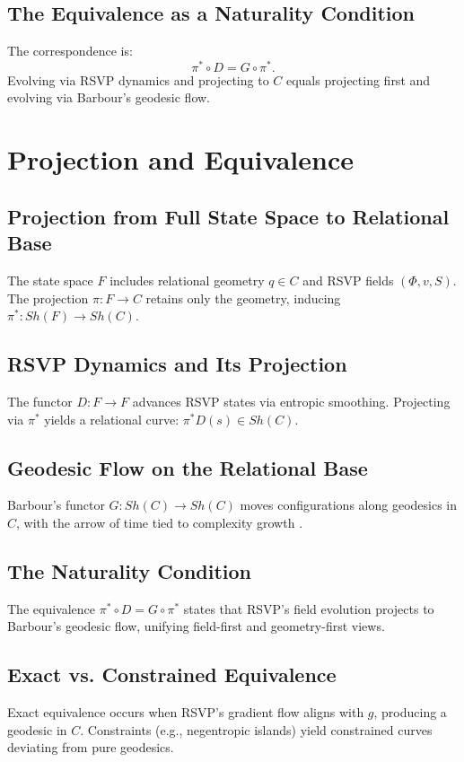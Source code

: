 \documentclass[11pt]{article}
\begin{document}
\subsection{The Equivalence as a Naturality Condition}
The correspondence is:
\[
\pi^* \circ D = G \circ \pi^*.
\]
Evolving via RSVP dynamics and projecting to $C$ equals projecting first and evolving via Barbour’s geodesic flow.

\section{Projection and Equivalence}

\subsection{Projection from Full State Space to Relational Base}
The state space $F$ includes relational geometry $q \in C$ and RSVP fields $(\Phi, v, S)$. The projection $\pi: F \to C$ retains only the geometry, inducing $\pi^*: Sh(F) \to Sh(C)$.

\subsection{RSVP Dynamics and Its Projection}
The functor $D: F \to F$ advances RSVP states via entropic smoothing. Projecting via $\pi^*$ yields a relational curve: $\pi^* D(s) \in Sh(C)$.

\subsection{Geodesic Flow on the Relational Base}
Barbour’s functor $G: Sh(C) \to Sh(C)$ moves configurations along geodesics in $C$, with the arrow of time tied to complexity growth \citep{Barbour2014}.

\subsection{The Naturality Condition}
The equivalence $\pi^* \circ D = G \circ \pi^*$ states that RSVP’s field evolution projects to Barbour’s geodesic flow, unifying field-first and geometry-first views.

\subsection{Exact vs. Constrained Equivalence}
Exact equivalence occurs when RSVP’s gradient flow aligns with $g$, producing a geodesic in $C$. Constraints (e.g., negentropic islands) yield constrained curves deviating from pure geodesics.
\end{document}
